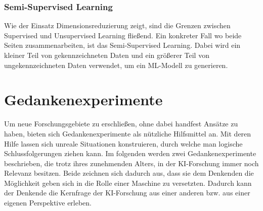 \documentclass[12pt,german,ngerman]{report}
\begin{document}
    \subsection{Semi-Supervised Learning}
        Wie der Einsatz Dimensionsreduzierung zeigt, sind die Grenzen zwischen Supervised und Unsupervised Learning fließend.
        Ein konkreter Fall wo beide Seiten zusammenarbeiten, ist das Semi-Supervised Learning.
        Dabei wird ein kleiner Teil von gekennzeichneten Daten und ein größerer Teil von ungekennzeichneten Daten verwendet,
        um ein ML-Modell zu generieren.\cite{semisupervised2021mlmastery}


            

\chapter{Gedankenexperimente}
    Um neue Forschungsgebiete zu erschließen, ohne dabei handfest Ansätze zu haben,
    bieten sich Gedankenexperimente als nützliche Hilfsmittel an.
    Mit deren Hilfe lassen sich unreale Situationen konstruieren, durch welche man logische Schlussfolgerungen ziehen kann.
    Im folgenden werden zwei Gedankenexperimente beschrieben, die trotz ihres zunehmenden Alters, in der KI-Forschung
    immer noch Relevanz besitzen. Beide zeichnen sich dadurch aus, dass sie dem Denkenden die Möglichkeit geben sich in die
    Rolle einer Maschine zu versetzten. Dadurch kann der Denkende die Kernfrage der KI-Forschung aus einer anderen
    bzw. aus einer eigenen Perspektive erleben. 
\end{document}
